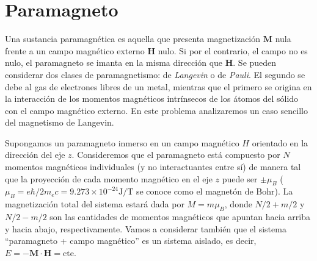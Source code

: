 \documentclass[a4paper,11pt]{article}
\begin{document}
\section{Paramagneto}

Una sustancia paramagnética es aquella que presenta magnetización 
$\mathbf{M}$ nula frente a un campo magnético externo $\mathbf{H}$ 
nulo.
Si por el contrario, el campo no es nulo, el paramagneto se imanta en 
la misma dirección que $\mathbf{H}$. Se pueden considerar dos clases de 
paramagnetismo: de \emph{Langevin} o de \emph{Pauli}.
El segundo se debe al gas de electrones libres de un metal, mientras 
que el primero se origina en la interacción de los momentos magnéticos 
intrínsecos de los átomos del sólido con el campo magnético externo.
En este problema analizaremos un caso sencillo del magnetismo de 
Langevin.

Supongamos un paramagneto inmerso en un campo magnético $H$ 
orientado en la dirección del eje $z$.
Consideremos que el paramagneto está compuesto por $N$ momentos 
magnéticos individuales (y no interactuantes entre sí) de manera tal 
que la proyección de cada momento magnético en el eje $z$ 
puede ser $\pm \mu_B$ ($\mu_B = e\hbar / 2m_e c = 9.273 \times 
10^{-24} \text{J/T}$ se conoce como el magnetón de Bohr).
La magnetización total del sistema estará dada por $M = m \mu_B$, donde 
$N/2 + m/2$ y $N/2 - m/2$ son las cantidades de momentos magnéticos que 
apuntan hacia arriba y hacia abajo, respectivamente.
Vamos a considerar también que el sistema ``paramagneto + campo 
magnético'' es un sistema aislado, es decir, $E = - 
\mathbf{M}\cdot\mathbf{H} = \text{cte}$.
\end{document}
